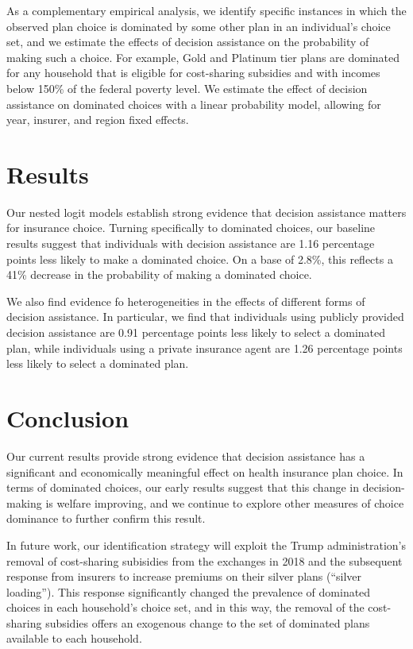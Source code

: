 \documentclass[
  12pt,
]{article}
\begin{document}
As a complementary empirical analysis, we identify specific instances in which the observed plan choice is dominated by some other plan in an individual's choice set, and we estimate the effects of decision assistance on the probability of making such a choice. For example, Gold and Platinum tier plans are dominated for any household that is eligible for cost-sharing subsidies and with incomes below 150\% of the federal poverty level. We estimate the effect of decision assistance on dominated choices with a linear probability model, allowing for year, insurer, and region fixed effects.

\hypertarget{results}{%
\section{Results}\label{results}}

Our nested logit models establish strong evidence that decision assistance matters for insurance choice. Turning specifically to dominated choices, our baseline results suggest that individuals with decision assistance are 1.16 percentage points less likely to make a dominated choice. On a base of 2.8\%, this reflects a 41\% decrease in the probability of making a dominated choice.

We also find evidence fo heterogeneities in the effects of different forms of decision assistance. In particular, we find that individuals using publicly provided decision assistance are 0.91 percentage points less likely to select a dominated plan, while individuals using a private insurance agent are 1.26 percentage points less likely to select a dominated plan.

\hypertarget{conclusion}{%
\section{Conclusion}\label{conclusion}}

Our current results provide strong evidence that decision assistance has a significant and economically meaningful effect on health insurance plan choice. In terms of dominated choices, our early results suggest that this change in decision-making is welfare improving, and we continue to explore other measures of choice dominance to further confirm this result.

In future work, our identification strategy will exploit the Trump administration's removal of cost-sharing subisidies from the exchanges in 2018 and the subsequent response from insurers to increase premiums on their silver plans (``silver loading''). This response significantly changed the prevalence of dominated choices in each household's choice set, and in this way, the removal of the cost-sharing subsidies offers an exogenous change to the set of dominated plans available to each household.
\end{document}
